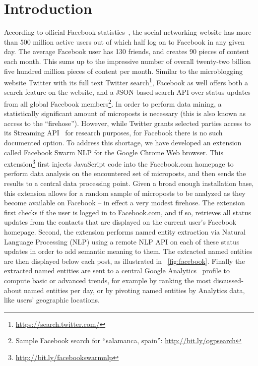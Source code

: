 \documentclass[conference]{IEEEtran}
\begin{document}
\IEEEpeerreviewmaketitle

\section{Introduction}                                                      \label{sec:introduction}
According to official Facebook statistics~\cite{Facebook}, the social networking website has more than 500 million active users out of which half log on to Facebook in any given day. The average Facebook user has 130 friends, and creates 90 pieces of content each month. This sums up to the impressive number of overall twenty-two billion five hundred million pieces of content per month. Similar to the microblogging website Twitter with its full text Twitter search\footnote{\url{https://search.twitter.com/}}, Facebook as well offers both a search feature on the website, and a JSON-based search API over status updates from all global Facebook members\footnote{Sample Facebook search for ``salamanca, spain'': \url{http://bit.ly/ogpsearch}}. In order to perform data mining, a statistically significant amount of microposts is necessary (this is also known as access to the ``firehose''). However, while Twitter grants selected parties access to its Streaming API~\cite{Twitter} for research purposes, for Facebook there is no such documented option. To address this shortage, we have developed an extension called Facebook Swarm NLP for the Google Chrome Web browser. This extension\footnote{\url{http://bit.ly/facebookswarmnlp}} first injects JavaScript code into the Facebook.com homepage to perform data analysis on the encountered set of microposts, and then sends the results to a central data processing point. Given a broad enough installation base, this extension allows for a random sample of microposts to be analyzed as they become available on Facebook -- in effect a very modest firehose. The extension first checks if the user is logged in to Facebook.com, and if so, retrieves all status updates from the contacts that are displayed on the current user's Facebook homepage. Second, the extension performs named entity extraction via Natural Language Processing (NLP) using a remote NLP API on each of these status updates in order to add semantic meaning to them. The extracted named entities are then displayed below each post, as illustrated in ~\autoref{fig:facebook}. Finally the extracted named entities are sent to a central Google Analytics~\cite{Kaushik} profile to compute basic or advanced trends, for example by ranking the most discussed-about named entities per day, or by pivoting named entities by Analytics data, like users' geographic locations.
\end{document}
